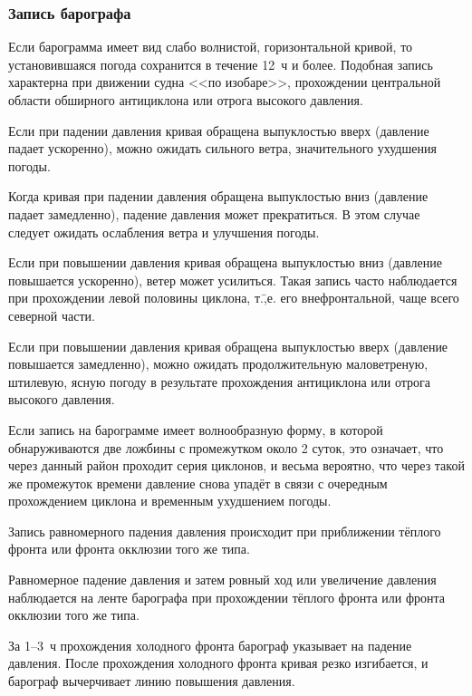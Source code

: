 \subsubsection{Запись барографа}

 Если барограмма имеет вид слабо волнистой, горизонтальной
кривой, то установившаяся погода сохранится в течение 12~ч и
более. Подобная запись характерна при движении судна <<по изобаре>>,
прохождении центральной области обширного антициклона или отрога
высокого давления.

 Если при падении давления кривая обращена выпуклостью вверх
(давление падает ускоренно), можно ожидать сильного ветра,
значительного ухудшения погоды.

 Когда кривая при падении давления обращена выпуклостью вниз
(давление падает замедленно), падение давления может прекратиться. В
этом случае следует ожидать ослабления ветра и улучшения погоды.

 Если при повышении давления кривая обращена выпуклостью вниз
(давление повышается ускоренно), ветер может усилиться. Такая запись
часто наблюдается при прохождении левой половины циклона, т.\=,е. его
внефронтальной, чаще всего северной части.

 Если при повышении давления кривая обращена выпуклостью вверх
(давление повышается замедленно), можно ожидать продолжительную
маловетреную, штилевую, ясную погоду в результате прохождения
антициклона или отрога высокого давления.

 Если запись на барограмме имеет волнообразную форму, в которой
обнаруживаются две ложбины с промежутком около 2 суток, это означает,
что через данный район проходит серия циклонов, и весьма вероятно, что
через такой же промежуток времени давление снова упадёт в связи с
очередным прохождением циклона и временным ухудшением погоды.

 Запись равномерного падения давления происходит при
приближении тёплого фронта или фронта окклюзии того же типа.

 Равномерное падение давления и затем ровный ход или увеличение
давления наблюдается на ленте барографа при прохождении тёплого фронта
или фронта окклюзии того же типа.

 За 1--3~ч прохождения холодного фронта барограф указывает на
падение давления. После прохождения холодного фронта кривая резко
изгибается, и барограф вычерчивает линию повышения давления.

